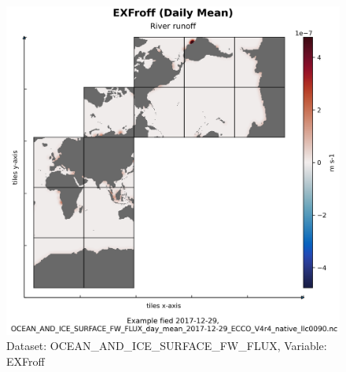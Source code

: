 \begin{figure}[H]
\centering
\includegraphics[scale=0.55]{../images/plots/native_plots/Ocean_and_Sea-Ice_Surface_Freshwater_Fluxes/EXFroff.png}
\caption{Dataset: OCEAN\_AND\_ICE\_SURFACE\_FW\_FLUX, Variable: EXFroff}
\label{tab:table-OCEAN_AND_ICE_SURFACE_FW_FLUX_EXFroff-Plot}
\end{figure}
\pagebreak
